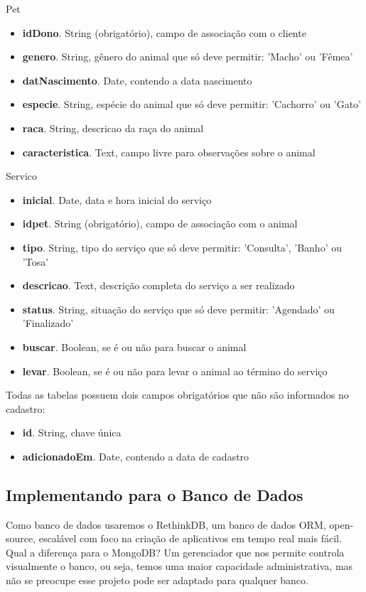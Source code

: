 \documentclass[a4paper,11pt]{article}
\begin{document}
{\ttfamily Pet} \vspace{-1em}
\begin{itemize}[nolistsep]
  \item \textbf{idDono}. String (obrigatório), campo de associação com o cliente
  \item \textbf{genero}. String, gênero do animal que só deve permitir: 'Macho' ou 'Fêmea'
  \item \textbf{datNascimento}. Date, contendo a data nascimento
  \item \textbf{especie}. String, espécie do animal que só deve permitir: 'Cachorro' ou 'Gato'
  \item \textbf{raca}. String, descricao da raça do animal
  \item \textbf{caracteristica}. Text, campo livre para observações sobre o animal
\end{itemize}

{\ttfamily Servico} \vspace{-1em}
\begin{itemize}[nolistsep]
  \item \textbf{inicial}. Date, data e hora inicial do serviço
  \item \textbf{idpet}. String (obrigatório), campo de associação com o animal
  \item \textbf{tipo}. String, tipo do serviço que só deve permitir: 'Consulta', 'Banho' ou 'Tosa'
  \item \textbf{descricao}. Text, descrição completa do serviço a ser realizado
  \item \textbf{status}. String, situação do serviço que só deve permitir: 'Agendado' ou 'Finalizado'
  \item \textbf{buscar}. Boolean, se é ou não para buscar o animal
  \item \textbf{levar}. Boolean, se é ou não para levar o animal ao término do serviço
\end{itemize}

Todas as tabelas possuem dois campos obrigatórios que não são informados no cadastro: \vspace{-1em}
\begin{itemize}[nolistsep]
  \item \textbf{id}. String, chave única
  \item \textbf{adicionadoEm}. Date, contendo a data de cadastro
\end{itemize}

\subsection{Implementando para o Banco de Dados}
Como banco de dados usaremos o RethinkDB, um banco de dados ORM, open-source, escalável com foco na criação de aplicativos em tempo real mais fácil. Qual a diferença para o MongoDB? Um gerenciador que nos permite controla visualmente o banco, ou seja, temos uma maior capacidade administrativa, mas não se preocupe esse projeto pode ser adaptado para qualquer banco. 
\end{document}
